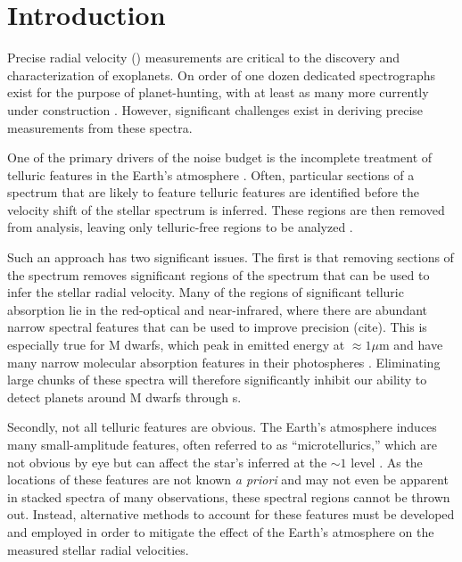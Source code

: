 \documentclass[modern]{aastex62}
\begin{document}
\section{Introduction}

Precise radial velocity (\RV) measurements are critical to the discovery and characterization of exoplanets. 
On order of one dozen dedicated spectrographs exist for the purpose of \RV planet-hunting, with at least as many more currently under construction \citep{Wright2017}. 
However, significant challenges exist in deriving precise \RV measurements from these spectra. 

One of the primary drivers of the \RV noise budget is the incomplete treatment of telluric features in the
Earth's atmosphere \citep{Halverson2016}. 
Often, particular sections of a spectrum that are likely to feature telluric features are identified before the velocity shift of the stellar spectrum is inferred. 
These regions are then removed from analysis, leaving only telluric-free regions to be analyzed \citep[e.g.][]{AngladaEscude2012}.

Such an approach has two significant issues. 
The first is that removing sections of the spectrum removes significant regions of the spectrum that can be used to infer the stellar radial velocity. 
Many of the regions of significant telluric absorption lie in the red-optical and near-infrared, where there are abundant narrow spectral features that can be used to improve \RV precision (cite).
This is especially true for M dwarfs, which peak in emitted energy at $\approx 1 \mu$m and have many narrow molecular absorption features in their photospheres \citep{Figueira2016}.
Eliminating large chunks of these spectra will therefore significantly inhibit our ability to detect planets around M dwarfs through \RV s.

Secondly, not all telluric features are obvious. 
The Earth's atmosphere induces many small-amplitude features, often referred to as ``microtellurics,'' which are not obvious by eye but can affect the star's inferred \RV at the $\sim 1$ \ms level \citep{Cunha2014}. 
As the locations of these features are not known \textit{a priori} and may not even be apparent in stacked spectra of many observations, these spectral regions cannot be thrown out. 
Instead, alternative methods to account for these features must be developed and employed in order to mitigate the effect of the Earth's atmosphere on the measured stellar radial velocities.
\end{document}
